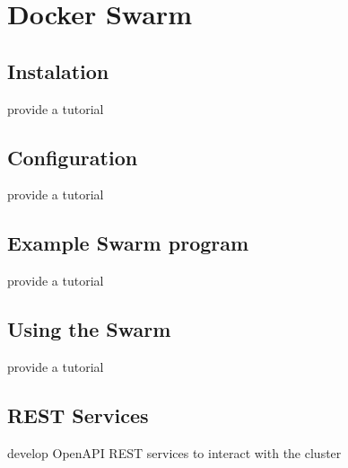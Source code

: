 \chapter{Docker Swarm}

\section{Instalation}

\begin{exercise}
provide a tutorial 
\end{exercise}

\section{Configuration}

\begin{exercise}
provide a tutorial 
\end{exercise}

\section{Example Swarm program}

\begin{exercise}
provide a tutorial 
\end{exercise}

\section{Using the Swarm}

\begin{exercise}
provide a tutorial 
\end{exercise}

\section{REST Services}

\begin{exercise}
develop OpenAPI REST services to interact with the cluster
\end{exercise}
